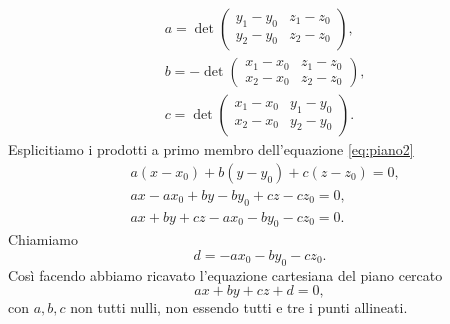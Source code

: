 \documentclass[a4paper]{article}
\begin{document}
\[
\begin{aligned}
& a=\operatorname{det}\left(\begin{array}{ll} y_1-y_0 & z_1-z_0 \\ y_2-y_0 & z_2-z_0 \end{array}\right), \\
& b=-\operatorname{det}\left(\begin{array}{ll}x_1-x_0& z_1-z_0 \\ x_2-x_0 & z_2-z_0 \end{array}\right),\\
& c=\operatorname{det}\left(\begin{array}{ll} x_1-x_0 & y_1-y_0 \\ x_2-x_0 & y_2-y_0 \end{array}\right). 
\end{aligned}
\]
Esplicitiamo i prodotti a primo membro dell'equazione \eqref{eq:piano2} 
\[
\begin{aligned}
& a\left(x-x_0\right)+b\left(y-y_0\right)+c\left(z-z_0\right)=0, \\
& a x-a x_0+b y-b y_0+c z-c z_0=0, \\
& a x+b y+c z-a x_0-b y_0-c z_0=0.
\end{aligned}
\]
Chiamiamo
$$
d=-a x_0-b y_0-c z_0.
$$ 
Così facendo abbiamo ricavato l'equazione cartesiana del piano cercato 
$$
ax+by+cz+d=0,
$$ 
con $a,b,c$ non tutti nulli, non essendo tutti e tre i punti allineati.
\end{document}
